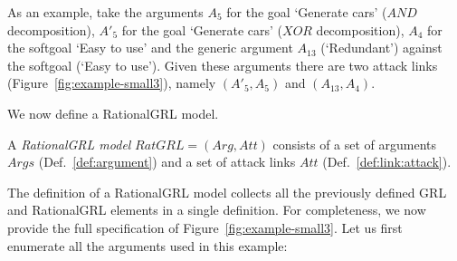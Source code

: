 As an example, take the arguments $A_5$ for the goal `Generate cars' ($AND$ decomposition), $A'_5$ for the goal `Generate cars' ($XOR$ decomposition), $A_4$ for the softgoal `Easy to use' and the generic argument $A_{13}$ (`Redundant') against the softgoal (`Easy to use'). Given these arguments there are two attack links (Figure~\ref{fig:example-small3}), namely $(A'_{5},A_{5})$ and $(A_{13}, A_{4})$.

We now define a RationalGRL model.

\begin{definition}
\label{def:rationalgrl-model}
A \emph{RationalGRL model} $RatGRL=(Arg, Att)$ consists of a set of arguments $Args$ (Def.~\ref{def:argument}) and a set of attack links $Att$ (Def.~\ref{def:link:attack}).
\end{definition}

The definition of a RationalGRL model collects all the previously defined GRL and RationalGRL elements in a single definition. For completeness, we now provide the full specification of Figure~\ref{fig:example-small3}. Let us first enumerate all the arguments used in this example:

